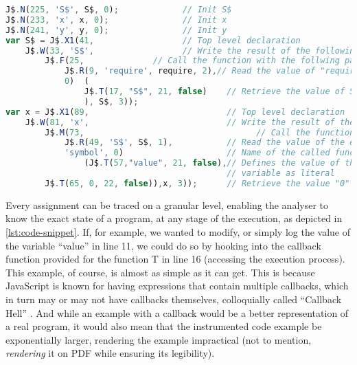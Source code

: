 \begin{lstlisting}[float, language=JavaScript, caption={[Instrumented program snippet]Lines 1 and 4 of the program snippet \autoref{lst:expose-sample-program}, instrumented by \textbf{JALANGI2}, with explanation}, label={lst:code-snippet}]
J$.N(225, 'S$', S$, 0);             // Init S$
J$.N(233, 'x', x, 0);               // Init x
J$.N(241, 'y', y, 0);               // Init y
var S$ = J$.X1(41,                  // Top level declaration
    J$.W(33, 'S$',                  // Write the result of the following:
        J$.F(25,              // Call the function with the follwing parameter:
            J$.R(9, 'require', require, 2),// Read the value of "require"
            0)  (
                J$.T(17, "S$", 21, false)    // Retrieve the value of S$
                ), S$, 3));
var x = J$.X1(89,                            // Top level declaration
    J$.W(81, 'x',                            // Write the result of the following:
        J$.M(73,                                   // Call the function of:
            J$.R(49, 'S$', S$, 1),           // Read the value of the expression S$
            'symbol', 0)                     // Name of the called function
                (J$.T(57,"value", 21, false),// Defines the value of the 
                                             // variable as literal
        J$.T(65, 0, 22, false)),x, 3));      // Retrieve the value "0"
\end{lstlisting}
Every assignment can be traced on a granular level, enabling the analyser to know the exact state of a program, at any stage of the execution, as depicted in \autoref{lst:code-snippet}. If, for example, we wanted to modify, or simply log the value of the variable “value” in line 11, we could do so by hooking into the callback function provided for the function T in line 16 (accessing the execution process).
This example, of course, is almost as simple as it can get. This is because JavaScript is known for having expressions that contain multiple callbacks, which in turn may or may not have callbacks themselves, colloquially called “Callback Hell” \cite{max_ogden_callback_2019}. And while an example with a callback would be a better representation of a real program, it would also mean that the instrumented code example be exponentially larger, rendering the example impractical (not to mention, \textit{rendering} it on PDF while ensuring its legibility). \\


